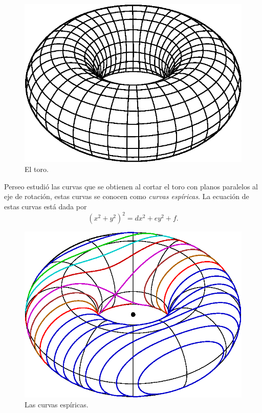 \begin{figure}
   \centering
   \includegraphics[scale=0.3]{images/toro}
   \caption{El toro.}
   \label{fig:toro}
\end{figure}

Perseo estudió las curvas que se obtienen al cortar el toro
con planos paralelos al eje de rotación, estas curvas se conocen como 
\emph{curvas espíricas}. La ecuación de estas curvas está dada por
\[
	(x^2+y^2)^2=dx^2+ey^2+f.
\]

\begin{figure}
   \centering
   \includegraphics[scale=0.3]{images/spiric}
   \caption{Las curvas espíricas.}
   \label{fig:spiric}
\end{figure}



